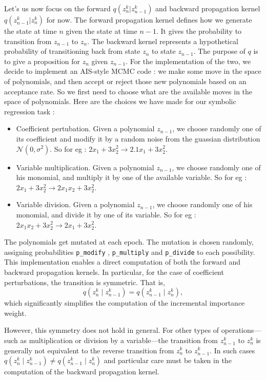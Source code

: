 \documentclass[11pt]{article}
\begin{document}
		Let's us now focus on the forward $q(z_n^k | z_{n-1}^k)$ and backward propagation kernel $q(z_{n-1}^k | z_n^k)$ for now. The forward propagation kernel defines how we generate the state at time $n$ given the state at time $n-1$. It gives the probability to transition from $z_{n-1}$ to $z_n$. The backward kernel represents a hypothetical probability of transitioning back from state $z_n$ to state $z_{n-1}$. The purpose of $q$ is to give a proposition for $z_n$ given $z_{n-1}$. For the implementation of the two, we decide to implement an AIS-style MCMC code : we make some move in the space of polynomials, and then accept or reject those new polynomials based on an acceptance rate. So we first need to choose what are the available moves in the space of polynomials. Here are the choices we have made for our symbolic regression task : 
		\begin{itemize}
			\item Coefficient pertubation. Given a polynomial $z_{n-1}$, we choose randomly one of its coefficient and modify it by a random noise from the guassian distribution $\mathcal{N}(0,\sigma^2)$. So for eg : $2 x_1 + 3 x_2^2 \rightarrow  2.1 x_1 + 3 x_2^2$.
			\item Variable multiplication. Given a polynomial $z_{n-1}$, we choose randomly one of his monomial, and multiply it by one of the available variable. So for eg : $2 x_1 + 3 x_2^2 \rightarrow  2 x_1 x_2 + 3 x_2^2$.
			\item Variable division. Given a polynomial $z_{n-1}$, we choose randomly one of his monomial, and divide it by one of its variable. So for eg : $2 x_1 x_2 + 3 x_2^2 \rightarrow  2 x_1 + 3 x_2^2$. 
		\end{itemize}
		The polynomials get mutated at each epoch. The mutation is chosen randomly, assigning probabilities \texttt{p\_{modify}} , \texttt{p\_{multiply}} and \texttt{p\_{divide}} to each possibility. This implementation enables a direct computation of both the forward and backward propagation kernels. In particular, for the case of coefficient perturbations, the transition is symmetric. That is,
		\begin{equation}
			q(z_n^k \mid z_{n-1}^k) = q(z_{n-1}^k \mid z_n^k),
		\end{equation}
		which significantly simplifies the computation of the incremental importance weight.
		
		However, this symmetry does not hold in general. For other types of operations—such as multiplication or division by a variable—the transition from \( z_{n-1}^k \) to \( z_n^k \) is generally not equivalent to the reverse transition from \( z_n^k \) to \( z_{n-1}^k \). In such cases $q(z_n^k \mid z_{n-1}^k) \ne q(z_{n-1}^k \mid z_n^k)$ and particular care must be taken in the computation of the backward propagation kernel.
		
\end{document}
